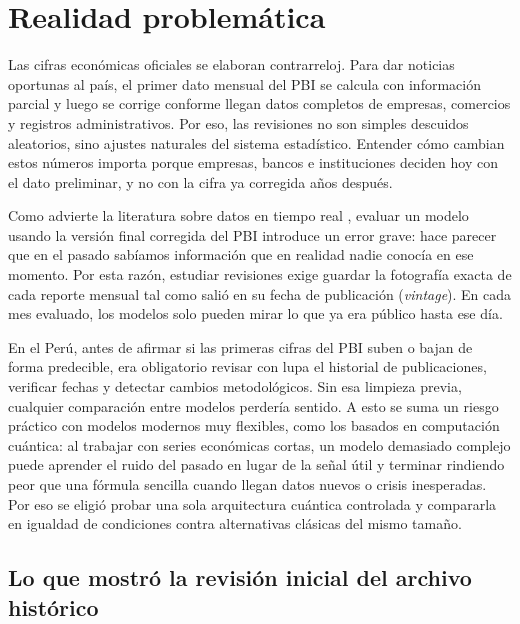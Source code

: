 \section{Realidad problemática}

Las cifras económicas oficiales se elaboran contrarreloj. Para dar noticias oportunas al país, el primer dato mensual del PBI se calcula con información parcial y luego se corrige conforme llegan datos completos de empresas, comercios y registros administrativos. Por eso, las revisiones no son simples descuidos aleatorios, sino ajustes naturales del sistema estadístico. Entender cómo cambian estos números importa porque empresas, bancos e instituciones deciden hoy con el dato preliminar, y no con la cifra ya corregida años después.

Como advierte la literatura sobre datos en tiempo real \parencite{croushore2011}, evaluar un modelo usando la versión final corregida del PBI introduce un error grave: hace parecer que en el pasado sabíamos información que en realidad nadie conocía en ese momento. Por esta razón, estudiar revisiones exige guardar la fotografía exacta de cada reporte mensual tal como salió en su fecha de publicación (\emph{vintage}). En cada mes evaluado, los modelos solo pueden mirar lo que ya era público hasta ese día.

En el Perú, antes de afirmar si las primeras cifras del PBI suben o bajan de forma predecible, era obligatorio revisar con lupa el historial de publicaciones, verificar fechas y detectar cambios metodológicos. Sin esa limpieza previa, cualquier comparación entre modelos perdería sentido. A esto se suma un riesgo práctico con modelos modernos muy flexibles, como los basados en computación cuántica: al trabajar con series económicas cortas, un modelo demasiado complejo puede aprender el ruido del pasado en lugar de la señal útil y terminar rindiendo peor que una fórmula sencilla cuando llegan datos nuevos o crisis inesperadas. Por eso se eligió probar una sola arquitectura cuántica controlada y compararla en igualdad de condiciones contra alternativas clásicas del mismo tamaño.

\subsection{Lo que mostró la revisión inicial del archivo histórico}

